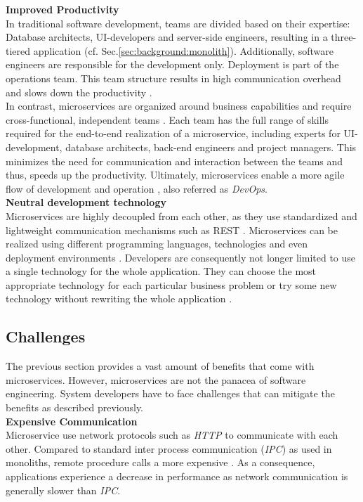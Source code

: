 \noindent
\textbf{Improved Productivity} \\
In traditional software development, teams are divided based on their expertise: Database architects, UI-developers and server-side engineers, resulting in a three-tiered application (cf. Sec.\ref{sec:background:monolith}). Additionally, software engineers are responsible for the development only. Deployment is part of the operations team. This team structure results in high communication overhead and slows down the productivity \cite{Mazlami}. \\
In contrast, microservices are organized around business capabilities and require cross-functional, independent teams \cite{ObjectAwareAmiri}. Each team has the full range of skills required for the end-to-end realization of a microservice, including experts for UI-development, database architects, back-end engineers and project managers. 
This minimizes the need for communication and interaction between the teams and thus, speeds up the productivity. Ultimately, microservices enable a more agile flow of development and operation \cite{ClassificationOfRefactoring}, also referred as \textit{DevOps}. 
\\


\noindent
\textbf{Neutral development technology} \\
Microservices are highly decoupled from each other, as they use standardized and lightweight communication mechanisms such as REST \cite{FunctionalDecompositionHeinrich}. Microservices can be realized using different programming languages, technologies and even deployment environments \cite{DataflowDrivenChen}. Developers are consequently not longer limited to use a single technology for the whole application. They can choose the most appropriate technology for each particular business problem or try some new technology without rewriting the whole application \cite{ServiceCutter} \cite{TowardsTechnique}. 
 



\subsection{Challenges}
The previous section provides a vast amount of benefits that come with microservices. However, microservices are not the panacea of software engineering. System developers have to face challenges that can mitigate the benefits as described previously. \\ 

\noindent
\textbf{Expensive Communication}\\
Microservice use network protocols such as \textit{HTTP} to communicate with each other. Compared to standard inter process communication (\textit{IPC}) as used in monoliths, remote procedure calls a more expensive \cite{SystematicMappingStudyMicroservice}. As a consequence, applications experience a decrease in performance as network communication is generally slower than \textit{IPC}.\\

